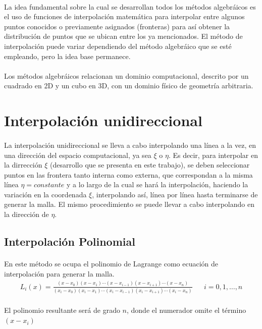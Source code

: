 \documentclass[letterpaper, openright, 12pt]{book}
\begin{document}
	\paragraph*{}
		La idea fundamental sobre la cual se desarrollan todos los métodos algebráicos es el uso de funciones de interpolación matemática para interpolar entre algunos puntos conocidos o previamente asignados (fronteras) para así obtener la distribución de puntos que se ubican entre los ya mencionados. El método de interpolación puede variar dependiendo del método algebráico que se esté empleando, pero la idea base permanece. \cite{siladic-grid-generation}
	\paragraph*{}
		Los métodos algebráicos relacionan un dominio computacional, descrito por un cuadrado en 2D y un cubo en 3D, con un dominio físico de geometría arbitraria.
		
		
	\section{Interpolación unidireccional}
		\paragraph*{}
			La interpolación unidireccional se lleva a cabo interpolando una línea a la vez, en una dirección del espacio computacional, ya sea $\xi$ o $\eta$. Es decir, para interpolar en la dirrección $\xi$ (desarrollo que se presenta en este trabajo), se deben seleccionar puntos en las frontera tanto interna como externa, que correspondan a la misma línea $\eta = constante$ y a lo largo de la cual se hará la interpolación, haciendo la variación en la coordenada $\xi$, interpolando así, línea por línea hasta terminarse de generar la malla. El mismo procedimiento se puede llevar a cabo interpolando en la dirección de $\eta$.
		\subsection{Interpolación Polinomial}\label{Lagrange}
			\paragraph*{}
				En este método se ocupa el polinomio de Lagrange como ecuación de interpolación para generar la malla.
				\begin{align}
					L_{i}(x) = \frac{ (x - x_{0} )(x - x_{1}) \dotsb (x - x_{i-1}) (x - x_{i+1}) \dotsb (x - x_{n}) }{(x_{i} - x_{0} )(x_{i} - x_{1}) \dotsb (x_{i} - x_{i-1}) (x_{i} - x_{i+1}) \dotsb (x_{i} - x_{n}) } && i = 0, 1, \dotsc , n
				\end{align}
				\\El polinomio resultante será de grado $n$, donde el numerador omite el término $(x - x_{i})$
			
\end{document}
